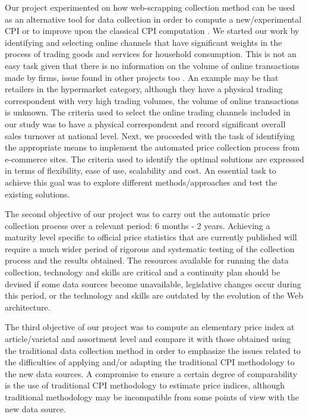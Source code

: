 \documentclass[]{article}
\begin{document}
Our project experimented on how web-scrapping collection method can be used as an alternative tool for data collection in order to compute a new/experimental CPI or to improve upon the classical CPI computation \cite{otawa2017}. We started our work by identifying and 
selecting online channels that have significant weights in the process of trading goods and services for household consumption. 
This is not an easy task given that there is no information on the volume of online transactions made by firms, 
issue found in other projects too \cite{willenborg2017}. 
An example may be that retailers in the hypermarket category, although they have a physical trading correspondent with very high 
trading volumes, the volume of online transactions is unknown. The criteria used to select the online trading channels included in 
our study was to have a physical correspondent and record significant overall sales turnover at national level. Next, we proceeded with the 
task of identifying the appropriate means to implement the automated price collection process from e-commerce sites. The criteria 
used to identify the optimal solutions are expressed in terms of flexibility, ease of use, scalability and cost. An essential task 
to achieve this goal was to explore different methods/approaches and test the existing solutions. 


The second objective of our project was to carry out the automatic price collection process over a relevant period: 6 months - 2 years. 
Achieving a maturity level specific to official price statistics that are currently published will require a much wider period of 
rigorous and systematic testing of the collection process and the results obtained. The resources available for running the data 
collection, technology and skills are critical and a continuity plan should be devised if some data sources become unavailable, 
legislative changes occur during this period, or the technology and skills are outdated by the evolution of the Web architecture. 


The third objective of our project was to compute an elementary price index at article/varietal and assortment level and compare 
it with those obtained using the traditional data collection method in order to emphasize the issues related to the difficulties 
of applying and/or adapting the traditional CPI methodology \cite{cpi} to the new data sources.  A compromise to 
ensure a certain degree of comparability is the use of traditional CPI methodology \cite{cpi2, cpi3} to estimate price indices, although 
traditional methodology may be incompatible from some points of view with the new data source. 
\end{document}
